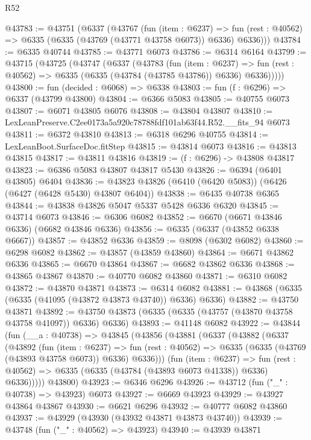 \begin{lexlean}{R52}
\begin{coremodule}
@43783 := @43751
    (@6337
      (@43767
        (fun (item : @6237) =>
        fun (rest : @40562) => @6335 (@6335 (@43769 (@43771 @43758 @6073)) @6336) @6336)))
@43784 := @6335 @40744
@43785 := @43771 @6073
@43786 := @6314 @6164
@43799 := @43715
    (@43725
      (@43747
        (@6337
          (@43783
            (fun (item : @6237) =>
            fun (rest : @40562) => @6335 (@6335 (@43784 (@43785 @43786)) @6336) @6336)))))
@43800 := fun (decided : @6068) => @6338
@43803 := fun (f : @6296) => @6337 (@43799 @43800)
@43804 := @6366 @5083
@43805 := @40755 @6073
@43807 := @6071 @43805 @6076
@43808 := @43804 @43807
@43810 := LexLeanPreserve.C2ee0173a5a920c78788fdf101ab63f44.R52.__fits_94 @6073
@43811 := @6372 @43810
@43813 := @6318 @6296 @40755
@43814 := LexLeanBoot.SurfaceDoc.fitStep
@43815 := @43814 @6073
@43816 := @43813 @43815
@43817 := @43811 @43816
@43819 := (f : @6296) -> @43808 @43817
@43823 := @6386 @5083 @43807 @43817 @5430
@43826 := @6394 (@6401 @43805) @6404
@43836 := @43823 @43826 (@6410 (@6420 @5083)) (@6426 (@6427 (@6428 @5430) @43807 @6404))
@43838 := @6435 @40738 @6365
@43844 := @43838 @43826 @5047 @5337 @5428 @6336 @6320
@43845 := @43714 @6073
@43846 := @6306 @6082
@43852 := @6670 (@6671 @43846 @6336) (@6682 @43846 @6336)
@43856 := @6335 (@6337 (@43852 @6338 @6667))
@43857 := @43852 @6336
@43859 := @8098 (@6302 @6082)
@43860 := @6298 @6082
@43862 := @43857 (@43859 @43860)
@43864 := @6671 @43862 @6336
@43865 := @6670 @43864
@43867 := @6682 @43862 @6336
@43868 := @43865 @43867
@43870 := @40770 @6082 @43860
@43871 := @6310 @6082
@43872 := @43870 @43871
@43873 := @6314 @6082
@43881 := @43868 (@6335 (@6335 (@41095 (@43872 @43873 @43740)) @6336) @6336)
@43882 := @43750 @43871
@43892 := @43750 @43873 (@6335 (@6335 (@43757 (@43870 @43758 @43758 @41097)) @6336) @6336)
@43893 := @41148 @6082
@43922 := @43844
    (fun (__a : @40738) =>
    @43845
      (@43856
        (@43881
          (@6337
            (@43882
              (@6337
                (@43892
                  (fun (item : @6237) =>
                  fun (rest : @40562) => @6335 (@6335 (@43769 (@43893 @43758 @6073)) @6336) @6336)))
              (fun (item : @6237) =>
              fun (rest : @40562) => @6335 (@6335 (@43784 (@43893 @6073 @41338)) @6336) @6336)))))
      @43800)
@43923 := @6346 @6296
@43926 := @43712 (fun ("_" : @40738) => @43923) @6073
@43927 := @6669 @43923
@43929 := @43927 @43864 @43867
@43930 := @6621 @6296
@43932 := @40777 @6082 @43860
@43937 := @43929 (@43930 (@43932 @43871 @43873 @43740))
@43939 := @43748 (fun ("_" : @40562) => @43923)
@43940 := @43939 @43871

\end{coremodule}
\end{lexlean}
